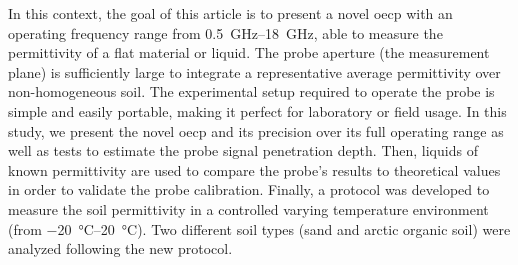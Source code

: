 In this context, the goal of this article is to present a novel \ac{oecp} with an operating frequency range from \SIrange{0.5}{18}{\giga\hertz}, able to measure the permittivity of a flat material or liquid.
The probe aperture (the measurement plane) is sufficiently large to integrate a representative average permittivity over non-homogeneous soil.
The experimental setup required to operate the probe is simple and easily portable, making it perfect for laboratory or field usage.
In this study, we present the novel \ac{oecp} and its precision over its full operating range as well as tests to estimate the probe signal penetration depth.
Then, liquids of known permittivity are used to compare the probe's results to theoretical values in order to validate the probe calibration.
Finally, a protocol was developed to measure the soil permittivity in a controlled varying temperature environment (from \qtyrange{-20}{20}{\degreeCelsius}).
Two different soil types (sand and arctic organic soil) were analyzed following the new protocol.
